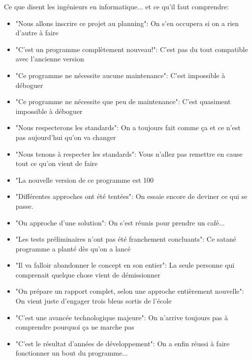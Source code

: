 Ce que disent les ingénieurs en informatique... et ce qu'il faut comprendre:
\begin{itemize}
	\item "Nous allons inscrire ce projet au planning": On s'en occupera si on a rien d'autre à faire

	\item "C'est un programme complètement nouveau!": C'est pas du tout compatible avec l'ancienne version

	\item "Ce programme ne nécessite aucune maintenance": C'est impossible à déboguer

	\item "Ce programme ne nécessite que peu de maintenance": C'est quasiment impossible à déboguer

	\item "Nous respecterons les standards": On a toujours fait comme ça et ce n'est pas aujourd'hui qu'on va changer

	\item "Nous tenons à respecter les standards": Vous n'allez pas remettre en cause tout ce qu'on vient de faire

	\item "La nouvelle version de ce programme est 100%

	\item "Différentes approches ont été tentées": On essaie encore de deviner ce qui se passe.

	\item "On approche d'une solution": On s'est réunis pour prendre un café...

	\item "Les tests préliminaires n'ont pas été franchement concluants": Ce satané programme a planté dès qu'on a lancé

	\item "Il va falloir abandonner le concept en son entier": La seule personne qui comprenait quelque chose vient de démissionner

	\item "On prépare un rapport complet, selon une approche entièrement nouvelle": On vient juste d'engager trois bleus sortis de l'école

	\item "C'est une avancée technologique majeure": On n'arrive toujours pas à comprendre pourquoi ça ne marche pas

	\item "C'est le résultat d'années de développement": On a enfin réussi à faire fonctionner un bout du programme...


\end{itemize}
